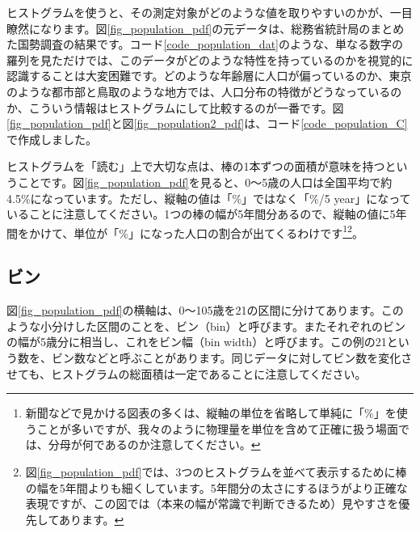 ヒストグラムを使うと、その測定対象がどのような値を取りやすいのかが、一目瞭然になります。図\ref{fig_population_pdf}の元データは、総務省統計局のまとめた国勢調査の結果です。コード\ref{code_population_dat}のような、単なる数字の羅列を見ただけでは、このデータがどのような特性を持っているのかを視覚的に認識することは大変困難です。どのような年齢層に人口が偏っているのか、東京のような都市部と鳥取のような地方では、人口分布の特徴がどうなっているのか、こういう情報はヒストグラムにして比較するのが一番です。図\ref{fig_population_pdf}と図\ref{fig_population2_pdf}は、コード\ref{code_population_C}で作成しました。



ヒストグラムを「読む」上で大切な点は、棒の1本ずつの面積が意味を持つということです。図\ref{fig_population_pdf}を見ると、0〜5歳の人口は全国平均で約4.5\%になっています。ただし、縦軸の値は「\%」ではなく「\%/5 year」になっていることに注意してください。1つの棒の幅が5年間分あるので、縦軸の値に5年間をかけて、単位が「\%」になった人口の割合が出てくるわけです\footnote{新聞などで見かける図表の多くは、縦軸の単位を省略して単純に「\%」を使うことが多いですが、我々のように物理量を単位を含めて正確に扱う場面では、分母が何であるのか注意してください。}\footnote{図\ref{fig_population_pdf}では、3つのヒストグラムを並べて表示するために棒の幅を5年間よりも細くしています。5年間分の太さにするほうがより正確な表現ですが、この図では（本来の幅が常識で判断できるため）見やすさを優先してあります。}。



\subsection{ビン}

図\ref{fig_population_pdf}の横軸は、0〜105歳を21の区間に分けてあります。このような小分けした区間のことを、ビン（bin）と呼びます。またそれぞれのビンの幅が5歳分に相当し、これをビン幅（bin width）と呼びます。この例の21という数を、ビン数などと呼ぶことがあります。同じデータに対してビン数を変化させても、ヒストグラムの総面積は一定であることに注意してください。

